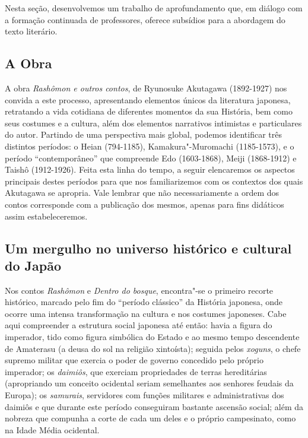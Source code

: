 \documentclass[12pt]{extarticle}
\begin{document}
Nesta seção, desenvolvemos um trabalho de aprofundamento que, em diálogo
com a formação continuada de professores, oferece subsídios para a
abordagem do texto literário.

\subsection{A Obra}

A obra \emph{Rashômon e outros contos}, de Ryunosuke Akutagawa
(1892-1927) nos convida a este processo, apresentando elementos únicos
da literatura japonesa, retratando a vida cotidiana de diferentes
momentos da sua História, bem como seus costumes e a cultura, além dos
elementos narrativos intimistas e particulares do autor. Partindo de uma
perspectiva mais global, podemos identificar três distintos períodos: o
Heian (794-1185), Kamakura"-Muromachi (1185-1573), e o período
``contemporâneo'' que compreende Edo (1603-1868), Meiji (1868-1912) e
Taishô (1912-1926). Feita esta linha do tempo, a seguir elencaremos os
aspectos principais destes períodos para que nos familiarizemos com os
contextos dos quais Akutagawa se apropria. Vale lembrar que não
necessariamente a ordem dos contos corresponde com a publicação dos
mesmos, apenas para fins didáticos assim estabeleceremos.


\subsection{Um mergulho no universo histórico e cultural do Japão}

Nos contos \emph{Rashômon} e \emph{Dentro do bosque}, encontra"-se o
primeiro recorte histórico, marcado pelo fim do ``período clássico'' da
História japonesa, onde ocorre uma intensa transformação na cultura e
nos costumes japoneses. Cabe aqui compreender a estrutura social
japonesa até então: havia a figura do imperador, tido como figura
simbólica do Estado e ao mesmo tempo descendente de Amaterasu (a deusa
do sol na religião xintoísta); seguida pelos \emph{xoguns}, o chefe
supremo militar que exercia o poder de governo concedido pelo próprio
imperador; os \emph{daimiôs}, que exerciam propriedades de terras
hereditárias (apropriando um conceito ocidental seriam semelhantes aos
senhores feudais da Europa); os \emph{samurais}, servidores com funções
militares e administrativas dos daimiôs e que durante este período
conseguiram bastante ascensão social; além da nobreza que compunha a
corte de cada um deles e o próprio campesinato, como na Idade Média
ocidental.
\end{document}
